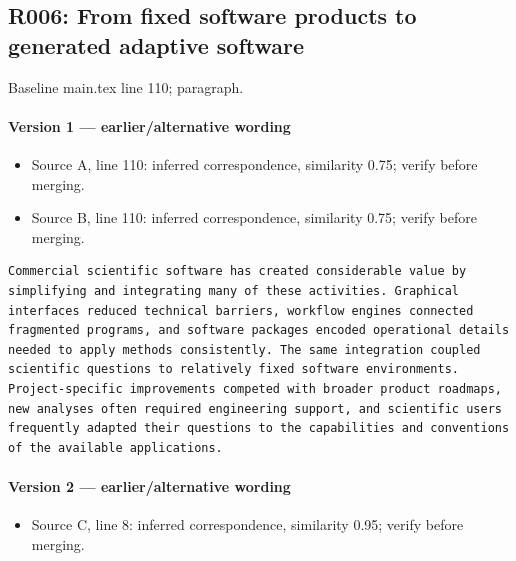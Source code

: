 \documentclass[11pt]{article}
\begin{document}
\subsection{R006: From fixed software products to generated adaptive software}

Baseline main.tex line 110; paragraph.

\paragraph{Version 1 --- earlier/alternative wording}

\begin{itemize}[leftmargin=*]
\item Source A, line 110: inferred correspondence, similarity 0.75; verify before merging.
\item Source B, line 110: inferred correspondence, similarity 0.75; verify before merging.
\end{itemize}

\begin{lstlisting}
Commercial scientific software has created considerable value by simplifying and integrating many of these activities. Graphical interfaces reduced technical barriers, workflow engines connected fragmented programs, and software packages encoded operational details needed to apply methods consistently. The same integration coupled scientific questions to relatively fixed software environments. Project-specific improvements competed with broader product roadmaps, new analyses often required engineering support, and scientific users frequently adapted their questions to the capabilities and conventions of the available applications.
\end{lstlisting}

\paragraph{Version 2 --- earlier/alternative wording}

\begin{itemize}[leftmargin=*]
\item Source C, line 8: inferred correspondence, similarity 0.95; verify before merging.
\end{itemize}
\end{document}
